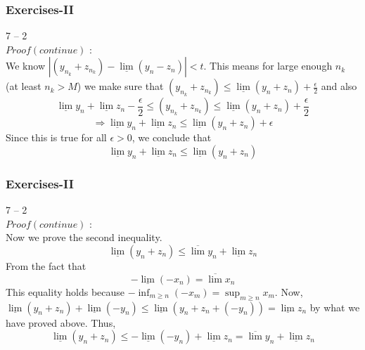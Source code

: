 \documentclass[12pt, t]{beamer}
\begin{document}
\begin{frame}
    \frametitle{Exercises-II}
    7 -- 2\\
    $Proof(continue)$ : \\
    \hspace{1em} We know $|(y_{n_k}+z_{n_k})-\underline{\lim}(y_n-z_n)|<t$. This means for large enough $n_k$ (at least $n_k>M$) we make sure that
    $(y_{n_k}+z_{n_k})\leq \underline{\lim}(y_n+z_n)+\frac{\epsilon}{2}$ and also
    \begin{equation*}
        \underline{\lim}y_n+\underline{\lim}z_n-\frac{\epsilon}{2}\leq (y_{n_k}+z_{n_k})\leq \underline{\lim}(y_n+z_n)+\frac{\epsilon}{2}
    \end{equation*}
    \begin{equation*}
        \Rightarrow \underline{\lim}y_n+\underline{\lim}z_n\leq \underline{\lim}(y_n+z_n)+\epsilon
    \end{equation*}
    \hspace{1em} Since this is true for all $\epsilon>0$, we conclude that
    \begin{equation*}
        \underline{\lim}y_n+\underline{\lim}z_n\leq \underline{\lim}(y_n+z_n)
    \end{equation*}

\end{frame}

\begin{frame}
    \frametitle{Exercises-II}
    7 -- 2\\
    $Proof(continue)$ : \\
    \hspace{1em} Now we prove the second inequality.
    \begin{equation*}
        \underline{\lim} (y_n+z_n)\leq\overline{\lim}y_n+\underline{\lim}z_n
    \end{equation*}
    \hspace{1em} From the fact that
    \begin{equation*}
        -\underline{\lim}(-x_n)=\overline{\lim}x_n
    \end{equation*}
    \hspace{1em} This equality holds because $-\inf_{m\geq n}(-x_m)=\sup_{m\geq n}x_m$. Now,
    $\underline{\lim}(y_n+z_n)+\underline{\lim}(-y_n)\leq \underline{\lim}(y_n+z_n+(-y_n))=\underline{\lim}z_n$
    by what we have proved above. Thus,
    \begin{equation*}
        \underline{\lim}(y_n+z_n)\leq -\underline{\lim}(-y_n)+\underline{\lim}z_n=\overline{\lim}y_n+\underline{\lim}z_n
    \end{equation*}

\end{frame}
\end{document}
